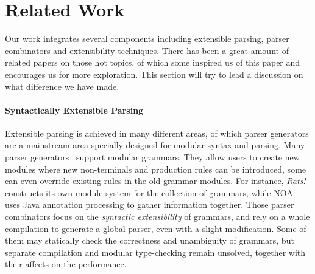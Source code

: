 \section{Related Work}\label{sec:relatedwork}

%
%
%
%

Our work integrates several components including extensible parsing,
parser combinators and extensibility techniques. There has been a
great amount of related papers on those hot topics, of which some
inspired us of this paper and encourages us for more exploration. This
section will try to lead a discussion on what difference we have made.

\paragraph{Syntactically Extensible Parsing} Extensible parsing is achieved in many
different areas, of which parser generators are a mainstream area
specially designed for modular syntax and parsing. Many parser
generators~\cite{antlr1995,Grimm2006,Gouseti2014,Warth2016} support
modular grammars. They allow users to create new
modules where new non-terminals and production rules can be
introduced, some can even override existing rules in the old grammar
modules. For instance, \textit{Rats!}~\cite{Grimm2006} constructs its
own module system for the collection of grammars, while
NOA~\cite{Gouseti2014} uses Java annotation processing to gather
information together. Those parser combinators focus on the
\textit{syntactic extensibility} of grammars, and rely on a whole
compilation to generate a global parser, even with a slight
modification. Some of them may statically check the correctness and
unambiguity of grammars, but separate compilation and modular
type-checking remain unsolved, together with their affects on the performance.

